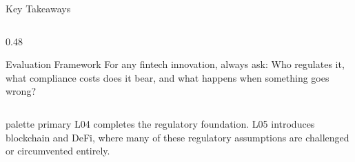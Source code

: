\documentclass[aspectratio=169, 11pt]{beamer}
\newcommand{\bottomnote}[1]{%
  \vfill
  \begin{beamercolorbox}[wd=\textwidth,ht=2ex,dp=1ex]{palette primary}%
    \tiny\hspace{1em}#1%
  \end{beamercolorbox}}
\begin{document}
\begin{frame}{Key Takeaways}
\begin{columns}[T]
\begin{column}{0.48\textwidth}
      \vspace{0.5em}
      \begin{block}{Evaluation Framework}
        For any fintech innovation, always ask: \textcolor{mlpurple}{Who
        regulates it, what compliance costs does it bear, and what happens
        when something goes wrong?}
      \end{block}
    \end{column}
  \end{columns}
  \bottomnote{L04 completes the regulatory foundation. L05 introduces blockchain and DeFi, where many of these regulatory assumptions are challenged or circumvented entirely.}
\end{frame}
\end{document}
